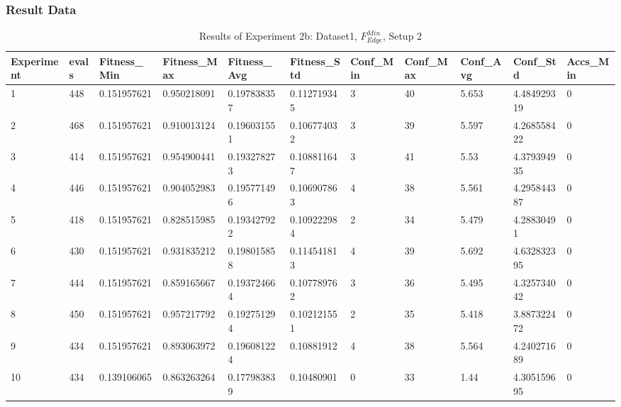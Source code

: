		\subsubsection{Result Data}
		\label{sec:A_Exp2b_Data}
			\begin{table}[H]
				\caption{Results of Experiment 2b: Dataset1, $F_{Edge}^{Min}$, Setup 2}
				\label{tab:A_Exp2b_Data}
				\begin{adjustbox}{max width=380pt,keepaspectratio,angle=90}
					\begin{tabular}{|l|l|l|l|l|l|l|l|l|l|l|}
						\rowcolor[HTML]{EFEFEF} 
						\hline
						Experiment & evals & Fitness\_Min & Fitness\_Max & Fitness\_Avg & Fitness\_Std & Conf\_Min & Conf\_Max & Conf\_Avg & Conf\_Std   & Accs\_Min \\ \hline
						1          & 448   & 0.151957621  & 0.950218091  & 0.197838357  & 0.112719345  & 3         & 40        & 5.653     & 4.484929319 & 0         \\ \hline
						2          & 468   & 0.151957621  & 0.910013124  & 0.196031551  & 0.106774032  & 3         & 39        & 5.597     & 4.268558422 & 0         \\ \hline
						3          & 414   & 0.151957621  & 0.954900441  & 0.193278273  & 0.108811647  & 3         & 41        & 5.53      & 4.379394935 & 0         \\ \hline
						4          & 446   & 0.151957621  & 0.904052983  & 0.195771496  & 0.106907863  & 4         & 38        & 5.561     & 4.295844387 & 0         \\ \hline
						5          & 418   & 0.151957621  & 0.828515985  & 0.193427922  & 0.109222984  & 2         & 34        & 5.479     & 4.28830491  & 0         \\ \hline
						6          & 430   & 0.151957621  & 0.931835212  & 0.198015858  & 0.114541813  & 4         & 39        & 5.692     & 4.632832395 & 0         \\ \hline
						7          & 444   & 0.151957621  & 0.859165667  & 0.193724664  & 0.107789762  & 3         & 36        & 5.495     & 4.325734042 & 0         \\ \hline
						8          & 450   & 0.151957621  & 0.957217792  & 0.192751294  & 0.102121551  & 2         & 35        & 5.418     & 3.887322472 & 0         \\ \hline
						9          & 434   & 0.151957621  & 0.893063972  & 0.196081224  & 0.10881912   & 4         & 38        & 5.564     & 4.240271689 & 0         \\ \hline
						10         & 434   & 0.139106065  & 0.863263264  & 0.177983839  & 0.10480901   & 0         & 33        & 1.44      & 4.305159695 & 0         \\ \hline\hline

\end{tabular}
\end{adjustbox}
\end{table}

